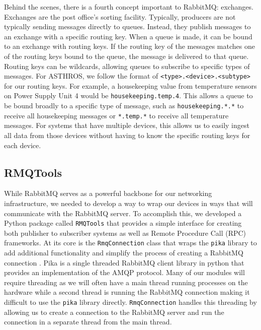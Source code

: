 Behind the scenes, there is a fourth concept important to RabbitMQ: exchanges.
Exchanges are the post office's sorting facility.
Typically, producers are not typically sending messages directly to queues. 
Instead, they publish messages to an exchange with a specific routing key.
When a queue is made, it can be bound to an exchange with routing keys.
If the routing key of the messages matches one of the routing keys bound to the queue, the message is delivered to that queue.
Routing keys can be wildcards, allowing queues to subscribe to specific types of messages. 
For ASTHROS, we follow the format of \texttt{<type>.<device>.<subtype>} for our routing keys.
For example, a housekeeping value from temperature sensors on Power Supply Unit 4 would be \texttt{housekeeping.temp.4}.
This allows a queue to be bound broadly to a specific type of message, such as \texttt{housekeeping.*.*} to receive all housekeeping messages or \texttt{*.temp.*} to receive all temperature messages.
For systems that have multiple devices, this allows us to easily ingest all data from those devices without having to know the specific routing keys for each device.

\subsection{RMQTools}
While RabbitMQ serves as a powerful backbone for our networking infrastructure, we needed to develop a way to wrap our devices in ways that will communicate with the RabbitMQ server.
To accomplish this, we developed a Python package called \texttt{RMQTools} that provides a simple interface for creating both publisher to subscriber systems as well as Remote Procedure Call (RPC) frameworks.
At its core is the \texttt{RmqConnection} class that wraps the \texttt{pika} library to add additional functionality and simplify the process of creating a RabbitMQ connection \parencite{pika}.
Pika is a single threaded RabbitMQ client library in python that provides an implementation of the AMQP protocol.
Many of our modules will require threading as we will often have a main thread running processes on the hardware while a second thread is running the RabbitMQ connection making it difficult to use the \texttt{pika} library directly.
\texttt{RmqConnection} handles this threading by allowing us to create a connection to the RabbitMQ server and run the connection in a separate thread from the main thread.

